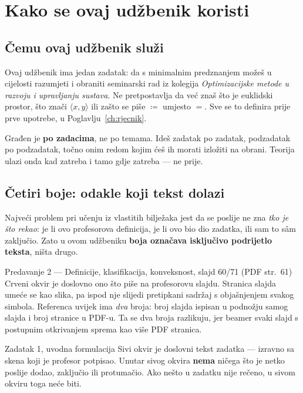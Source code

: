 \chapter{Kako se ovaj udžbenik koristi}
\label{ch:kako-koristiti}

\section{Čemu ovaj udžbenik služi}

Ovaj udžbenik ima jedan zadatak: da s minimalnim predznanjem možeš u cijelosti
razumjeti i obraniti seminarski rad iz kolegija \emph{Optimizacijske metode u razvoju i
upravljanju sustava}. Ne pretpostavlja da već znaš što je euklidski prostor, što znači
$\langle x, y \rangle$ ili zašto se piše $\coloneqq$ umjesto $=$. Sve se to definira
prije prve upotrebe, u Poglavlju~\ref{ch:rjecnik}.

Građen je \textbf{po zadacima}, ne po temama. Ideš zadatak po zadatak, podzadatak po
podzadatak, točno onim redom kojim ćeš ih morati izložiti na obrani. Teorija ulazi
onda kad zatreba i tamo gdje zatreba --- ne prije.

\section{Četiri boje: odakle koji tekst dolazi}

Najveći problem pri učenju iz vlastitih bilježaka jest da se poslije ne zna
\emph{tko je što rekao}: je li ovo profesorova definicija, je li ovo bio dio zadatka,
ili sam to sâm zaključio. Zato u ovom udžbeniku \textbf{boja označava isključivo
podrijetlo teksta}, ništa drugo.

\begin{izvor}{Predavanje 2 --- Definicije, klasifikacija, konveksnost, slajd 60/71 (PDF str.~61)}
Crveni okvir je doslovno ono što piše na profesorovu slajdu. Stranica slajda umeće se
kao slika, pa ispod nje slijedi pretipkani sadržaj s objašnjenjem svakog simbola.
Referenca uvijek ima \emph{dva} broja: broj slajda ispisan u podnožju samog slajda i
broj stranice u PDF-u. Ta se dva broja razlikuju, jer beamer svaki slajd s postupnim
otkrivanjem sprema kao više PDF stranica.

\end{izvor}

\begin{zadatak}{Zadatak 1, uvodna formulacija}
Sivi okvir je doslovni tekst zadatka --- izravno sa skena koji je profesor potpisao.
Unutar sivog okvira \textbf{nema} ničega što je netko poslije dodao, zaključio ili
protumačio. Ako nešto u zadatku nije rečeno, u sivom okviru toga neće biti.
\end{zadatak}

